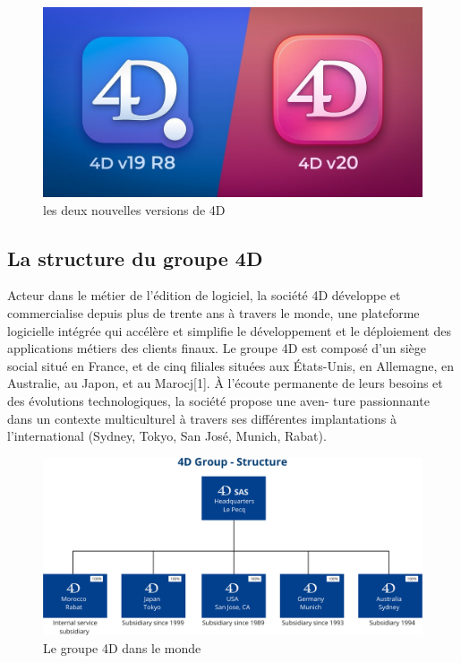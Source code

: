 \vspace{0.5cm}

\begin{figure}[h]
    \centering
    \includegraphics[scale=0.3]{Images/v19v20.jpg} %
    \caption{les deux nouvelles versions de 4D}
    \label{fig:v19v20}
\end{figure}



\subsection{La structure du groupe 4D}
Acteur dans le métier de l’édition de logiciel, la société
4D développe et commercialise depuis plus de trente 
ans à travers le monde, une plateforme logicielle 
intégrée qui accélère et simplifie le développement
et le déploiement des applications métiers des clients finaux.
Le groupe 4D est composé d’un siège social situé en France, 
et de cinq filiales situées aux États-Unis, en Allemagne, 
en Australie, au Japon, et au Marocj[1]. À l’écoute permanente 
de leurs besoins et des évolutions technologiques, 
la société propose une aven- ture passionnante dans un 
contexte multiculturel à travers ses différentes implantations 
à l’international (Sydney, Tokyo, San José, Munich, Rabat).

\vspace{1cm}

\begin{figure}[h]
    \centering
    \includegraphics[scale=0.35]{Images/groupe.png} %
    \caption{Le groupe 4D dans le monde}
    \label{fig:groupe}
\end{figure}

